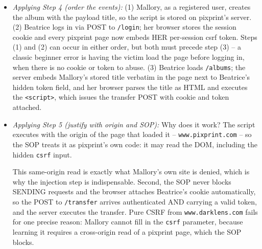 \documentclass[12pt, a4paper]{article}
\begin{document}
\begin{itemize}
Read it piece by piece: \texttt{document.getElementsByName("csrf")[0].value} pulls the hidden token out of the surrounding page (a normal same-origin DOM read, legal for any pixprint script); \texttt{post("/transfer", ...)} then sends the transfer POST with \texttt{to=mallory}, \texttt{amount=200} and the stolen token appended.
Beginner note: the payload must live where it will be EXECUTED -- a stored title, not a message Mallory sends to the server API.
    \item \textit{Applying Step 4 (order the events):} (1) Mallory, as a registered user, creates the album with the payload title, so the script is stored on pixprint's server. (2) Beatrice logs in via POST to \texttt{/login}; her browser stores the session cookie and every pixprint page now embeds HER per-session csrf token.
    Steps (1) and (2) can occur in either order, but both must precede step (3) -- a classic beginner error is having the victim load the page before logging in, when there is no cookie or token to abuse. (3) Beatrice loads \texttt{/albums};
    the server embeds Mallory's stored title verbatim in the page next to Beatrice's hidden token field, and her browser parses the title as HTML and executes the \texttt{<script>}, which issues the transfer POST with cookie and token attached.
    \item \textit{Applying Step 5 (justify with origin and SOP):} Why does it work? The script executes with the origin of the page that loaded it -- \texttt{www.pixprint.com} -- so the SOP treats it as pixprint's own code: it may read the DOM, including the hidden \texttt{csrf} input.

    This same-origin read is exactly what Mallory's own site is denied, which is why the injection step is indispensable.
    Second, the SOP never blocks SENDING requests and the browser attaches Beatrice's cookie automatically, so the POST to \texttt{/transfer} arrives authenticated AND carrying a valid token, and the server executes the transfer.
    Pure CSRF from \texttt{www.darklens.com} fails for one precise reason: Mallory cannot fill in the \texttt{csrf} parameter, because learning it requires a cross-origin read of a pixprint page, which the SOP blocks.


\end{itemize}
\end{document}
